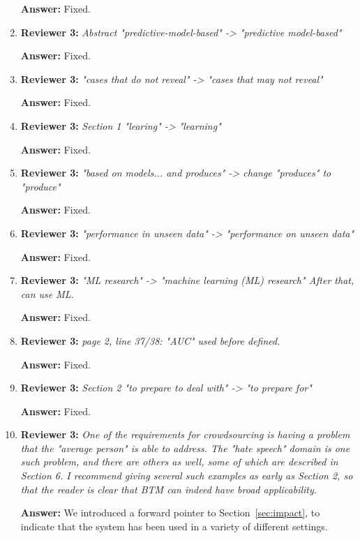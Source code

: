 \documentclass[letterpaper]{article}
\begin{document}
\begin{enumerate}
\textbf{Answer:} Fixed.

\item \textbf{Reviewer 3:} \emph{ Abstract "predictive-model-based" -> "predictive model-based"}

\textbf{Answer:} Fixed.

\item \textbf{Reviewer 3:} \emph{ "cases that do not reveal" -> "cases that may not reveal"}

\textbf{Answer:} Fixed.

\item \textbf{Reviewer 3:} \emph{ Section 1 "learing" -> "learning"}

\textbf{Answer:} Fixed.

\item \textbf{Reviewer 3:} \emph{ "based on models... and produces" -> change "produces" to "produce"}

\textbf{Answer:} Fixed.

\item \textbf{Reviewer 3:} \emph{ "performance in unseen data" -> "performance on unseen data"}

\textbf{Answer:} Fixed.

\item \textbf{Reviewer 3:} \emph{ "ML research" -> "machine learning (ML) research" After that, can use ML.}

\textbf{Answer:} Fixed.

\item \textbf{Reviewer 3:} \emph{ page 2, line 37/38: "AUC" used before defined.}

\textbf{Answer:} Fixed.

\item \textbf{Reviewer 3:} \emph{Section 2 "to prepare to deal with" -> "to prepare for"}

\textbf{Answer:} Fixed.

\item \textbf{Reviewer 3:} \emph{ One of the requirements for crowdsourcing is having a problem that the "average person" is able to address.  The "hate speech" domain is one such problem, and there are others as well, some of which are described in Section 6. I recommend giving several such examples as early as Section 2, so that the reader is clear that BTM can indeed have broad applicability.}

\textbf{Answer:} We introduced a forward pointer to Section~\ref{sec:impact}, to indicate that the system has been used in a variety of different settings.


\end{enumerate}
\end{document}
